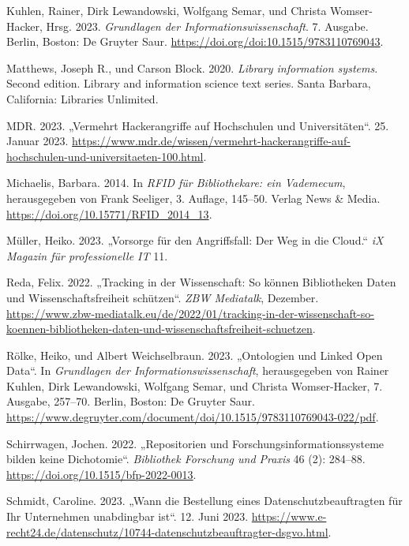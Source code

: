 \documentclass[
  11pt,
  letterpaper,
  DIV=11,
  twoside]{scrreprt}
\newlength{\cslhangindent}
\newenvironment{CSLReferences}[2] %
 {\begin{list}{}{%
  \setlength{\itemindent}{0pt}
  \setlength{\leftmargin}{0pt}
  \setlength{\parsep}{0pt}
  \ifodd #1
   \setlength{\leftmargin}{\cslhangindent}
   \setlength{\itemindent}{-1\cslhangindent}
  \fi
  \setlength{\itemsep}{#2\baselineskip}}}
 {\end{list}}
\begin{document}
\begin{CSLReferences}{1}{0}
Kuhlen, Rainer, Dirk Lewandowski, Wolfgang Semar, und Christa
Womser-Hacker, Hrsg. 2023. \emph{Grundlagen der
Informationswissenschaft}. 7. Ausgabe. Berlin, Boston: De Gruyter Saur.
\url{https://doi.org/doi:10.1515/9783110769043}.

Matthews, Joseph R., und Carson Block. 2020. \emph{Library information
systems}. Second edition. Library and information science text series.
Santa Barbara, California: Libraries Unlimited.

MDR. 2023. {„Vermehrt Hackerangriffe auf Hochschulen und
Universitäten``}. 25. Januar 2023.
\url{https://www.mdr.de/wissen/vermehrt-hackerangriffe-auf-hochschulen-und-universitaeten-100.html}.

Michaelis, Barbara. 2014. In \emph{{RFID} für Bibliothekare: ein
Vademecum}, herausgegeben von Frank Seeliger, 3. Auflage, 145--50.
Verlag News \& Media. \url{https://doi.org/10.15771/RFID_2014_13}.

Müller, Heiko. 2023. {„Vorsorge für den Angriffsfall: Der Weg in die
Cloud.``} \emph{{iX} Magazin für professionelle {IT}} 11.

Reda, Felix. 2022. {„Tracking in der Wissenschaft: So können
Bibliotheken Daten und Wissenschaftsfreiheit schützen``}. \emph{{ZBW}
Mediatalk}, Dezember.
\url{https://www.zbw-mediatalk.eu/de/2022/01/tracking-in-der-wissenschaft-so-koennen-bibliotheken-daten-und-wissenschaftsfreiheit-schuetzen}.

Rölke, Heiko, und Albert Weichselbraun. 2023. {„Ontologien und Linked
Open Data``}. In \emph{Grundlagen der Informationswissenschaft},
herausgegeben von Rainer Kuhlen, Dirk Lewandowski, Wolfgang Semar, und
Christa Womser-Hacker, 7. Ausgabe, 257--70. Berlin, Boston: De Gruyter
Saur.
\url{https://www.degruyter.com/document/doi/10.1515/9783110769043-022/pdf}.

Schirrwagen, Jochen. 2022. {„Repositorien und
Forschungsinformationssysteme bilden keine Dichotomie``}.
\emph{Bibliothek Forschung und Praxis} 46 (2): 284--88.
\url{https://doi.org/10.1515/bfp-2022-0013}.

Schmidt, Caroline. 2023. {„Wann die Bestellung eines
Datenschutzbeauftragten für Ihr Unternehmen unabdingbar ist``}. 12. Juni
2023.
\url{https://www.e-recht24.de/datenschutz/10744-datenschutzbeauftragter-dsgvo.html}.


\end{CSLReferences}
\end{document}
